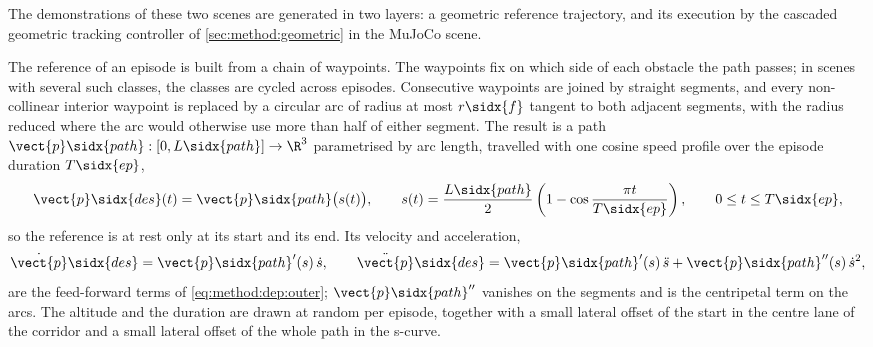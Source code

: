 The demonstrations of these two scenes are generated in two layers: a geometric reference trajectory,
and its execution by the cascaded geometric tracking controller of \autoref{sec:method:geometric} in the
MuJoCo scene.

The reference of an episode is built from a chain of waypoints. The waypoints fix on which side of each
obstacle the path passes; in scenes with several such classes, the classes are cycled across episodes.
Consecutive waypoints are joined by straight segments, and every non-collinear interior waypoint is
replaced by a circular arc of radius at most $r\sidx{f}$ tangent to both adjacent segments, with the
radius reduced where the arc would otherwise use more than half of either segment. The result is a
path $\vect{p}\sidx{path}:[0,L\sidx{path}]\to\R^{3}$ parametrised by arc length, travelled with one cosine
speed profile over the episode duration $T\sidx{ep}$,
\begin{equation}\label{eq:method:env:uavref}
  \vect{p}\sidx{des}(t) = \vect{p}\sidx{path}\big(s(t)\big),
  \qquad
  s(t) = \frac{L\sidx{path}}{2}\left(1-\cos\frac{\pi t}{T\sidx{ep}}\right),
  \qquad 0\le t\le T\sidx{ep},
\end{equation}
so the reference is at rest only at its start and its end. Its velocity and acceleration,
\begin{equation}\label{eq:method:env:uavrefderiv}
  \dot{\vect{p}}\sidx{des} = \vect{p}\sidx{path}'(s)\,\dot{s},
  \qquad
  \ddot{\vect{p}}\sidx{des} = \vect{p}\sidx{path}'(s)\,\ddot{s} + \vect{p}\sidx{path}''(s)\,\dot{s}^{2},
\end{equation}
are the feed-forward terms of \eqref{eq:method:dep:outer}; $\vect{p}\sidx{path}''$ vanishes on the segments
and is the centripetal term on the arcs. The altitude and the duration are drawn at random per
episode, together with a small lateral offset of the start in the centre lane of the corridor and a
small lateral offset of the whole path in the s-curve.

